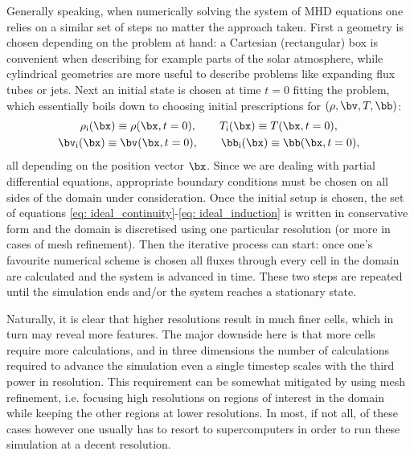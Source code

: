Generally speaking, when numerically solving the system of MHD equations one relies on a similar set of steps no matter the approach taken. First a geometry is chosen depending on the problem at hand: a Cartesian (rectangular) box is convenient when describing for example parts of the solar atmosphere, while cylindrical geometries are more useful to describe problems like expanding flux tubes or jets. Next an initial state is chosen at time $t = 0$ fitting the problem, which essentially boils down to choosing initial prescriptions for $(\rho, \bv, T, \bb)$:
\begin{equation}
  \begin{gathered}
    \rho_\text{i}(\bx) \equiv \rho(\bx, t=0), \qquad T_\text{i}(\bx) \equiv T(\bx, t=0), \\
    \bv_\text{i}(\bx) \equiv \bv(\bx, t=0), \qquad \bb_\text{i}(\bx) \equiv \bb(\bx, t=0),
  \end{gathered}
\end{equation}
all depending on the position vector $\bx$. Since we are dealing with partial differential equations, appropriate boundary conditions must be chosen on all sides of the domain under consideration. Once the initial setup is chosen, the set of equations \eqref{eq: ideal_continuity}-\eqref{eq: ideal_induction} is written in conservative form and the domain is discretised using one particular resolution (or more in cases of mesh refinement). Then the iterative process can start: once one's favourite numerical scheme is chosen all fluxes through every cell in the domain are calculated and the system is advanced in time. These two steps are repeated until the simulation ends and/or the system reaches a stationary state.

Naturally, it is clear that higher resolutions result in much finer cells, which in turn may reveal more features. The major downside here is that more cells require more calculations, and in three dimensions the number of calculations required to advance the simulation even a single timestep scales with the third power in resolution. This requirement can be somewhat mitigated by using mesh refinement, i.e. focusing high resolutions on regions of interest in the domain while keeping the other regions at lower resolutions. In most, if not all, of these cases however one usually has to resort to supercomputers in order to run these simulation at a decent resolution.



